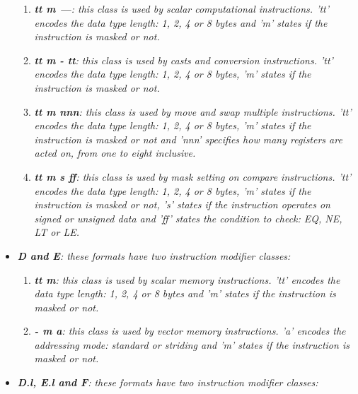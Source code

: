 \documentclass{article}
\begin{document}
\begin{itemize}
\begin{enumerate}
                        \item \textit{\textbf{tt m ---}: this class is used by scalar computational instructions. 'tt' encodes the data type length: 1, 2, 4 or 8 bytes and 'm' states if the instruction is masked or not.}

                        \item \textit{\textbf{tt m - tt}: this class is used by casts and conversion instructions. 'tt' encodes the data type length: 1, 2, 4 or 8 bytes, 'm' states if the instruction is masked or not.}

                        \item \textit{\textbf{tt m nnn}: this class is used by move and swap multiple instructions. 'tt' encodes the data type length: 1, 2, 4 or 8 bytes, 'm' states if the instruction is masked or not and 'nnn' specifies how many registers are acted on, from one to eight inclusive.}

                        \item \textit{\textbf{tt m s ff}: this class is used by mask setting on compare instructions. 'tt' encodes the data type length: 1, 2, 4 or 8 bytes, 'm' states if the instruction is masked or not, 's' states if the instruction operates on signed or unsigned data and 'ff' states the condition to check: EQ, NE, LT or LE.}

                    \end{enumerate}

                \item \textit{\textbf{D and E}: these formats have two instruction modifier classes:}

                    \begin{enumerate}

                        \item \textit{\textbf{tt m}: this class is used by scalar memory instructions. 'tt' encodes the data type length: 1, 2, 4 or 8 bytes and 'm' states if the instruction is masked or not.}

                        \item \textit{\textbf{- m a}: this class is used by vector memory instructions. 'a' encodes the addressing mode: standard or striding and 'm' states if the instruction is masked or not.}

                    \end{enumerate}

                \item \textit{\textbf{D.l, E.l and F}: these formats have two instruction modifier classes:}


\end{itemize}
\end{document}
